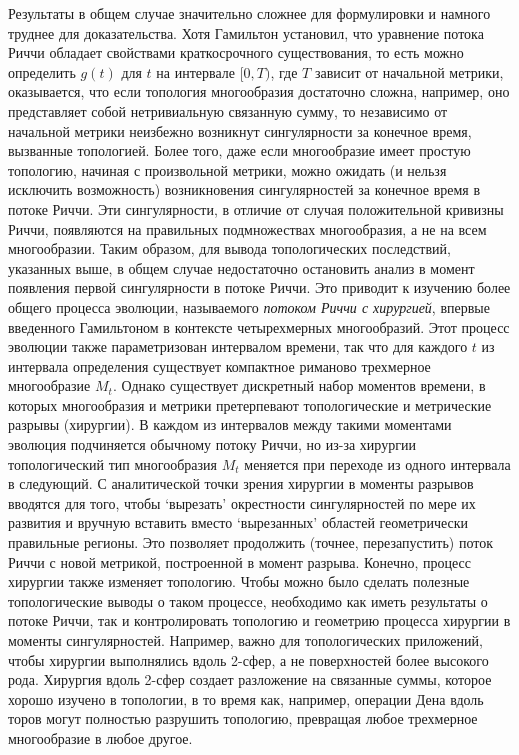 Результаты в общем случае значительно сложнее для формулировки и намного 
труднее для доказательства. Хотя Гамильтон установил, что уравнение потока 
Риччи обладает свойствами краткосрочного существования, то есть можно определить 
$g(t)$ для $t$ на интервале $[0,T)$, где $T$ зависит от начальной метрики, оказывается, что 
если топология многообразия достаточно сложна, например, оно представляет собой 
нетривиальную связанную сумму, то независимо от начальной метрики неизбежно 
возникнут сингулярности за конечное время, вызванные топологией. Более того, 
даже если многообразие имеет простую топологию, начиная с произвольной метрики, 
можно ожидать (и нельзя исключить возможность) возникновения сингулярностей за 
конечное время в потоке Риччи. Эти сингулярности, в отличие от случая положительной 
кривизны Риччи, появляются на правильных подмножествах многообразия, 
а не на всем многообразии.
Таким образом, для вывода топологических последствий, указанных выше, в общем 
случае недостаточно остановить анализ в момент появления первой сингулярности 
в потоке Риччи. Это приводит к изучению более общего процесса эволюции, 
называемого \textit{потоком Риччи с хирургией}, впервые введенного Гамильтоном в контексте 
четырехмерных многообразий. Этот процесс эволюции также параметризован интервалом 
времени, так что для каждого $t$ из интервала определения существует компактное 
риманово трехмерное многообразие $M_{t}$. Однако существует дискретный набор моментов 
времени, в которых многообразия и метрики претерпевают топологические и 
метрические разрывы (хирургии). В каждом из интервалов между такими моментами 
эволюция подчиняется обычному потоку Риччи, но из-за хирургии топологический 
тип многообразия $M_{t}$ меняется при переходе из одного интервала в следующий.
С аналитической точки зрения хирургии в моменты разрывов вводятся для того, 
чтобы `вырезать' окрестности сингулярностей по мере их развития и вручную 
вставить вместо `вырезанных'  областей геометрически правильные регионы. 
Это позволяет продолжить (точнее, перезапустить) поток Риччи с новой метрикой, 
построенной в момент разрыва. Конечно, процесс хирургии также изменяет топологию. 
Чтобы можно было сделать полезные топологические выводы о таком процессе, 
необходимо как иметь результаты о потоке Риччи, так и контролировать топологию и 
геометрию процесса хирургии в моменты сингулярностей. Например, важно для 
топологических приложений, чтобы хирургии выполнялись вдоль 2-сфер, а не 
поверхностей более высокого рода. Хирургия вдоль 2-сфер создает разложение на 
связанные суммы, которое хорошо изучено в топологии, в то время как, например, 
операции Дена вдоль торов могут полностью разрушить топологию, превращая любое 
трехмерное многообразие в любое другое.

